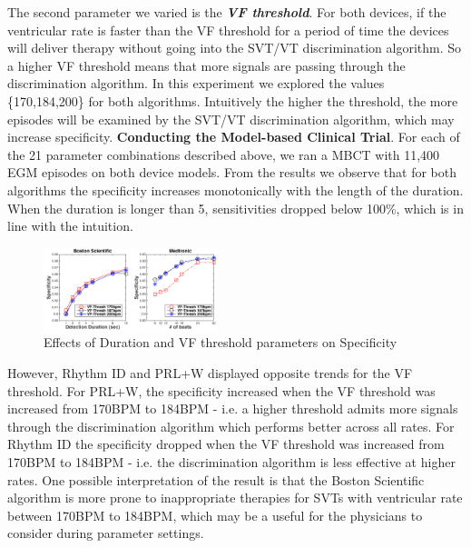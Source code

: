 The second parameter we varied is the \emph{\textbf{VF threshold}}.
For both devices, if the ventricular rate is faster than the VF threshold for a period of time the devices will deliver therapy without going into the SVT/VT discrimination algorithm. So a higher VF threshold means that more signals are passing through the discrimination algorithm.
In this experiment we explored the values \{170,184,200\} for both algorithms.
Intuitively the higher the threshold, the more episodes will be examined by the SVT/VT discrimination algorithm, which may increase specificity.
\newline\textbf{Conducting the Model-based Clinical Trial}. 
For each of the 21 parameter combinations described above, we ran a MBCT with 11,400 EGM episodes on both device models. 
From the results we observe that for both algorithms the specificity increases monotonically with the length of the duration.
When the duration is longer than 5, sensitivities dropped below 100\%, which is in line with the intuition.
\begin{figure}[t]
	
		\centering
		\vspace{-10pt}
		\includegraphics[width=0.45\textwidth]{figs/parameter.pdf}
		\caption{\small Effects of Duration and VF threshold parameters on Specificity}
		\vspace{-10pt}
		\label{fig:parameter}
\end{figure}
However, Rhythm ID and PRL+W displayed opposite trends for the VF threshold.
For PRL+W, the specificity increased when the VF threshold was increased from 170BPM to 184BPM - i.e. a higher threshold admits more signals through the discrimination algorithm which performs better across all rates.
For Rhythm ID the specificity dropped when the VF threshold was increased from 170BPM to 184BPM - i.e. the discrimination algorithm is less effective at higher rates. 
One possible interpretation of the result is that the Boston Scientific algorithm is more prone to inappropriate therapies for SVTs with ventricular rate between 170BPM to 184BPM, which may be a useful for the physicians to consider during parameter settings. 







